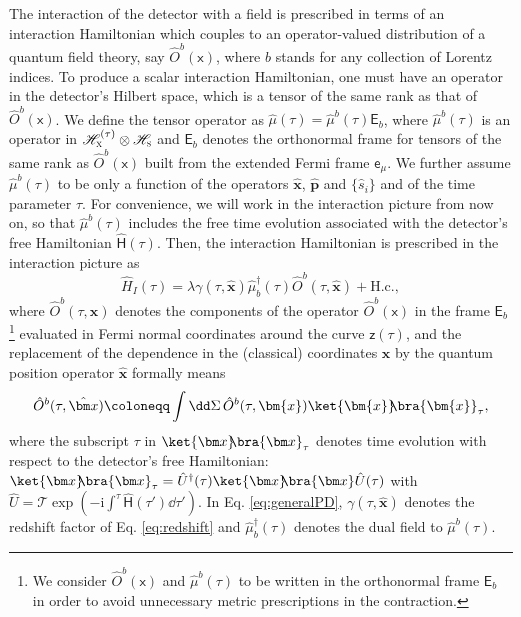 \documentclass[letterpaper,12pt,titlepage,oneside,final]{book}
\newcommand{\mf}{\mathsf}%
\newcommand{\ii}{\mathrm{i}}
\begin{document}
The interaction of the detector with a field is prescribed in terms of an interaction Hamiltonian which couples to an operator-valued distribution of a quantum field theory, say $\hat{O}^b(\mf x)$, where $b$ stands for any collection of Lorentz indices. To produce a scalar interaction Hamiltonian, one must have an operator in the detector's Hilbert space, which is a tensor of the same rank as that of $\hat{O}^b(\mf x)$. We define the tensor operator as $\hat{\mu}(\tau) = \hat{\mu}^b(\tau)\mf{E}_b$, where $\hat{\mu}^b(\tau)$ is an operator in $\mathscr{H}_\textsc{x}^{(\tau)}\otimes\mathscr{H}_\textsc{s}$ and $\mf E_b$ denotes the orthonormal frame for tensors of the same rank as $\hat{O}^b(\mf x)$ built from the extended Fermi frame $\mf e_\mu$. We further assume $\hat{\mu}^b(\tau)$ to be only a function of the operators $\hat{\bm x}$, $\hat{\bm p}$ and $\{\hat{s}_i\}$ and of the time parameter $\tau$. For convenience, we will work in the interaction picture from now on, so that $\hat{\mu}^b(\tau)$ includes the free time evolution associated with the detector's free Hamiltonian $\hat{\mathsf{H}}(\tau)$. Then, the interaction Hamiltonian is prescribed in the interaction picture as
\begin{equation}\label{eq:generalPD}
    \hat{H}_I(\tau) = \lambda \gamma(\tau,\hat{\bm x})\hat{\mu}^\dagger_b(\tau)\hat{O}^b(\tau,\hat{\bm x}) + \text{H.c.},
\end{equation}
where $\hat{O}^b(\tau,{\bm x})$ denote{s} the components of the operator $\hat{O}^b(\mf x)$ in the frame $\mf{E}_b$\footnote{We consider $\hat{O}^b(\mf x)$ and $\hat{\mu}^b(\tau)$ to be written in the orthonormal frame $\mf E_b$ in order to avoid unnecessary metric prescriptions in the contraction.} evaluated in Fermi normal coordinates around the curve $\mf z(\tau)$, { and the replacement of the dependence in the (classical) coordinates $\bm x$ by the quantum position operator $\hat{\bm x}$ formally means} 
\begin{equation}\label{eq:defOb}
    {\hat{O}^b(\tau,\hat{\bm x}) \coloneqq  \int
\dd\Sigma \,\hat{O}^b (\tau , \bm{x}) \ket{\bm{x}}\!\!\bra{\bm{x}}_{\tau},}
\end{equation}
{where the subscript $\tau$ in $\ket{\bm x}\!\!\bra{\bm x}_\tau$ denotes time evolution with respect to the detector's free Hamiltonian: $\ket{\bm x}\!\!\bra{\bm x}_\tau = \hat{U}^\dagger(\tau)\ket{\bm x}\!\!\bra{\bm x}\hat{U}(\tau)$ with $\hat{U} = \mathcal{T}\exp(-\ii \int^\tau \hat{\mathsf{H}}(\tau')\dd \tau')$.} In Eq. \eqref{eq:generalPD}, $\gamma(\tau,\hat{\bm x})$ denotes the redshift factor of Eq. \eqref{eq:redshift} and $\hat{\mu}_b^\dagger(\tau)$ denotes the dual field to $\hat{\mu}^b(\tau)$. %
\end{document}
